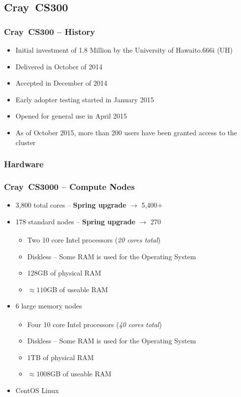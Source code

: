 \documentclass[t,hyperref={pdfpagelabels=false}]{beamer}
\newlength{\okinalen}
\newcommand{\okina}{\hbox to.666\okinalen{\hss`\hss}}
\newcommand{\regtrademark}{\fontsize{5}{6}\selectfont \textsuperscript{\textregistered}}
\newcommand{\hawaii}{Hawai{\okina}i}
\newcommand{\intel}{Intel{\regtrademark}}
\newcommand{\craycs}{Cray~CS300}
\begin{document}
\subsection{{\craycs}}
\begin{frame}
\frametitle{{\craycs} -- History}
\begin{itemize}
 \item Initial investment of 1.8 Million by the University of {\hawaii} (UH)
 \item Delivered in October of 2014
 \item Accepted in December of 2014 
 \item Early adopter testing started in January 2015
 \item Opened for general use in April 2015
 \item As of October 2015, more than 200 users have been granted access to the cluster
\end{itemize}
\end{frame}


\subsubsection{Hardware}
\begin{frame}
	\frametitle{{\craycs}0 -- Compute Nodes}
	\begin{itemize}
		\item 3,800 total cores -- \textbf{Spring upgrade} $\rightarrow$ 5,400$+$
		\item 178 standard nodes -- \textbf{Spring upgrade} $\rightarrow$ 270
			\begin{itemize}
				\item Two 10 core {\intel} processors (\emph{20 cores total})
				\item Diskless -- Some RAM is used for the Operating System
				\item 128GB of physical RAM
				\item $\approx110$GB of useable RAM
			\end{itemize}
		\item 6 large memory nodes
			\begin{itemize}
				\item Four 10 core {\intel} processors (\emph{40 cores total})
				\item Diskless -- Some RAM is used for the Operating System
				\item 1TB of physical RAM
				\item $\approx1008$GB of useable RAM
			\end{itemize}			
		\item CentOS Linux
	\end{itemize}
\end{frame}
\end{document}

